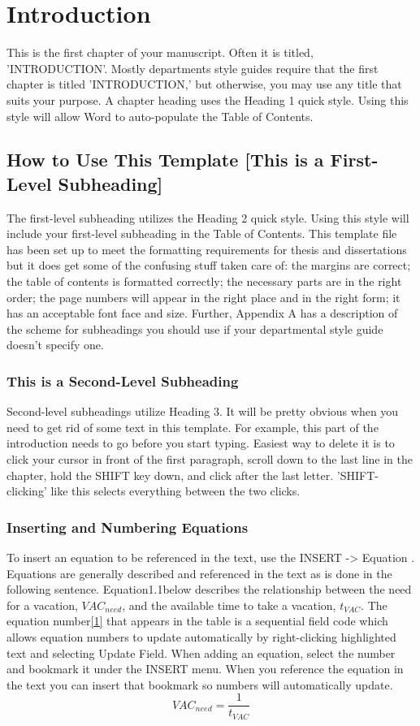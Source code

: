 \documentclass{article}
\begin{document}
\chapter{Introduction}
\begin{justify}
This is the first chapter of your manuscript. Often it is titled, 'INTRODUCTION'. Mostly departments  style guides require that the first chapter is titled 'INTRODUCTION,' but otherwise, you may use any title that suits your purpose. A chapter heading uses the  Heading 1  quick style.  Using this style will allow Word to auto-populate the Table of Contents.
\section{How to Use This Template [This is a First-Level Subheading]}
The first-level subheading utilizes the  Heading 2  quick style.  Using this style will include your first-level subheading in the Table of Contents. This template file has been set up to meet the formatting requirements for thesis and dissertations but it does get some of the confusing stuff taken care of: the margins are correct; the table of contents is formatted correctly; the necessary parts are in the right order; the page numbers will appear in the right place and in the right form; it has an acceptable font face and size. Further, Appendix A has a description of the scheme for subheadings you should use if your departmental style guide doesn't specify one.
\subsection{This is a Second-Level Subheading}
Second-level subheadings utilize Heading 3.  It will be pretty obvious when you need to get rid of some text in this template. For example, this part of the introduction needs to go before you start typing. Easiest way to delete it is to click your cursor in front of the first paragraph, scroll down to the last line in the chapter, hold the SHIFT key down, and click after the last letter. 'SHIFT-clicking' like this selects everything between the two clicks.
\subsection{Inserting and Numbering Equations}
To insert an equation to be referenced in the text, use the  INSERT  ->   Equation .\\
Equations are generally described and referenced in the text as is done in the following sentence.  Equation1.1below describes the relationship between the need for a vacation, $VAC_{need}$, and the available time to take a vacation, $t_{VAC}$.  The equation number\eqref{1} that appears in the table is a sequential field code which allows equation numbers to update automatically by right-clicking highlighted text and selecting  Update Field.   When adding an equation, select the number and bookmark it under the  INSERT  menu.  When you reference the equation in the text you can insert that bookmark so numbers will automatically update.
\begin{equation}\label{1}
    VAC_{need}=\frac{1}{t_{VAC}}
\end{equation}

\end{justify}
\end{document}
